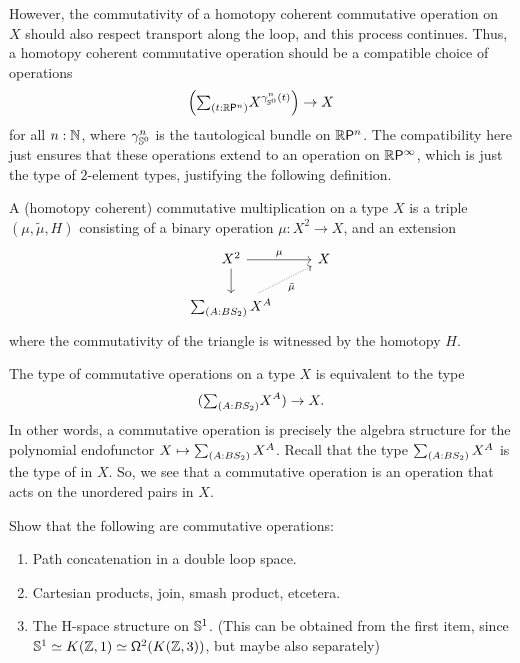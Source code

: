 \documentclass[reqno]{amsart}
\begin{document}
However, the commutativity of a homotopy coherent commutative operation on $X$ 
should also respect transport along the loop, and this process continues.
Thus, a homotopy coherent commutative operation should be a compatible choice
of operations
\begin{equation*}
\Big(\sm{t:\rprojective{n}} X^{\gamma^n_{\sphere{0}}(t)}\Big) \to X
\end{equation*}
for all $n:\mathbb{N}$, where $\gamma^n_{\mathbb{S}^{0}}$ is the tautological bundle on
$\mathbb{R}\mathsf{P}^{n}$. The compatibility here just ensures that these operations extend
to an operation on $\mathbb{R}\mathsf{P}^{\infty}$, which is just the type of $2$-element
types, justifying the following definition.

\begin{defn}
A (homotopy coherent) commutative multiplication on a type $X$ is a triple
$(\mu,\tilde{\mu},H)$ consisting of a binary operation $\mu:X^2\to X$, and
an extension
\begin{equation*}
\begin{tikzcd}
X^2 \arrow[r,"\mu"] \arrow[d] & X \\
\sm{A:B\symmetric{2}}X^A \arrow[ur,densely dotted,swap,"\tilde{\mu}"]
\end{tikzcd}
\end{equation*}
where the commutativity of the triangle is witnessed by the homotopy $H$.
\end{defn}

\begin{rmk}
The type of commutative operations on a type $X$ is equivalent to the type
\begin{equation*}
(\sm{A:B\symmetric{2}}X^A)\to X.
\end{equation*}
In other words, a commutative operation is precisely the algebra structure for
the polynomial endofunctor $X\mapsto \sm{A:B\symmetric{2}}X^A$. Recall that the
type $\sm{A:B\symmetric{2}}X^A$ is the type of  in $X$.
So, we see that a commutative operation is an operation that acts on the
unordered pairs in $X$. 
\end{rmk}

\begin{proposal}\label{p:commutative_ops_examples}
Show that the following are commutative operations:
\begin{enumerate}
\item Path concatenation in a double loop space.
\item Cartesian products, join, smash product, etcetera.
\item The H-space structure on $\mathbb{S}^{1}$. (This can be obtained from the first item, since $\eqv{\sphere{1}}{K(\Z,1)}{\loopspace[2]{K(\Z,3)}}$, but maybe also separately)
\end{enumerate}
\end{proposal}
\end{document}
